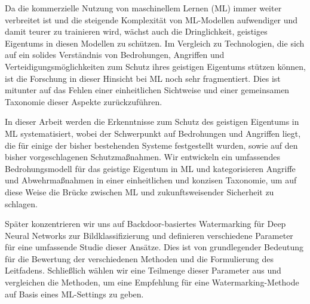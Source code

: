 \documentclass[draft,final]{vutinfth} %
\begin{document}
\begin{kurzfassung}
Da die kommerzielle Nutzung von maschinellem Lernen (ML) immer weiter verbreitet ist und die steigende Komplexität von ML-Modellen aufwendiger und damit teurer zu trainieren wird, wächst auch die Dringlichkeit, geistiges Eigentums in diesen Modellen zu schützen. Im Vergleich zu Technologien, die sich auf ein solides Verständnis von Bedrohungen, Angriffen und Verteidigungsmöglichkeiten zum Schutz ihres geistigen Eigentums stützen können, ist die Forschung in dieser Hinsicht bei ML noch sehr fragmentiert. Dies ist mitunter auf das Fehlen einer einheitlichen Sichtweise und einer gemeinsamen Taxonomie dieser Aspekte zurückzuführen.

In dieser Arbeit werden die Erkenntnisse zum Schutz des geistigen Eigentums in ML systematisiert, wobei der Schwerpunkt auf Bedrohungen und Angriffen liegt, die für einige der bisher bestehenden Systeme festgestellt wurden, sowie auf den bisher vorgeschlagenen Schutzmaßnahmen. Wir entwickeln ein umfassendes Bedrohungsmodell für das geistige Eigentum in ML und kategorisieren Angriffe und Abwehrmaßnahmen in einer einheitlichen und konzisen Taxonomie, um auf diese Weise die Brücke zwischen ML und zukunftsweisender Sicherheit zu schlagen.

Später konzentrieren wir uns auf Backdoor-basiertes Watermarking für Deep Neural Networks zur Bildklassifizierung und definieren verschiedene Parameter für eine umfassende Studie dieser Ansätze. Dies ist von grundlegender Bedeutung für die Bewertung der verschiedenen Methoden und die Formulierung des Leitfadens. Schließlich wählen wir eine Teilmenge dieser Parameter aus und vergleichen die Methoden, um eine Empfehlung für eine Watermarking-Methode auf Basis eines ML-Settings zu geben.
\end{kurzfassung}
\end{document}
